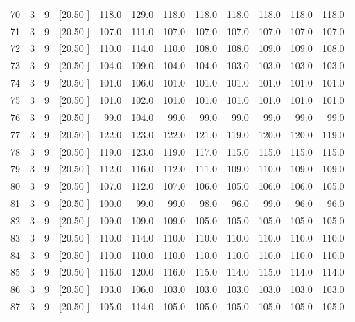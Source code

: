 \documentclass[12pt,a4paper]{article}
\begin{document}
\begin{center}
{\begin{tabular}{r r r r r r r r r r r r}
  70&  3&  9&[20.50     ]&   118.0&   129.0&   118.0&   118.0&   118.0&   118.0&   118.0&   118.0\\[-0.02in]
  71&  3&  9&[20.50     ]&   107.0&   111.0&   107.0&   107.0&   107.0&   107.0&   107.0&   107.0\\[-0.02in]
  72&  3&  9&[20.50     ]&   110.0&   114.0&   110.0&   108.0&   108.0&   109.0&   109.0&   108.0\\[-0.02in]
  73&  3&  9&[20.50     ]&   104.0&   109.0&   104.0&   104.0&   103.0&   103.0&   103.0&   103.0\\[-0.02in]
  74&  3&  9&[20.50     ]&   101.0&   106.0&   101.0&   101.0&   101.0&   101.0&   101.0&   101.0\\[-0.02in]
  75&  3&  9&[20.50     ]&   101.0&   102.0&   101.0&   101.0&   101.0&   101.0&   101.0&   101.0\\[-0.02in]
  76&  3&  9&[20.50     ]&    99.0&   104.0&    99.0&    99.0&    99.0&    99.0&    99.0&    99.0\\[-0.02in]
  77&  3&  9&[20.50     ]&   122.0&   123.0&   122.0&   121.0&   119.0&   120.0&   120.0&   119.0\\[-0.02in]
  78&  3&  9&[20.50     ]&   119.0&   123.0&   119.0&   117.0&   115.0&   115.0&   115.0&   115.0\\[-0.02in]
  79&  3&  9&[20.50     ]&   112.0&   116.0&   112.0&   111.0&   109.0&   110.0&   109.0&   109.0\\[-0.02in]
  80&  3&  9&[20.50     ]&   107.0&   112.0&   107.0&   106.0&   105.0&   106.0&   106.0&   105.0\\[-0.02in]
  81&  3&  9&[20.50     ]&   100.0&    99.0&    99.0&    98.0&    96.0&    99.0&    96.0&    96.0\\[-0.02in]
  82&  3&  9&[20.50     ]&   109.0&   109.0&   109.0&   105.0&   105.0&   105.0&   105.0&   105.0\\[-0.02in]
  83&  3&  9&[20.50     ]&   110.0&   114.0&   110.0&   110.0&   110.0&   110.0&   110.0&   110.0\\[-0.02in]
  84&  3&  9&[20.50     ]&   110.0&   110.0&   110.0&   110.0&   110.0&   110.0&   110.0&   110.0\\[-0.02in]
  85&  3&  9&[20.50     ]&   116.0&   120.0&   116.0&   115.0&   114.0&   115.0&   114.0&   114.0\\[-0.02in]
  86&  3&  9&[20.50     ]&   103.0&   106.0&   103.0&   103.0&   103.0&   103.0&   103.0&   103.0\\[-0.02in]
  87&  3&  9&[20.50     ]&   105.0&   114.0&   105.0&   105.0&   105.0&   105.0&   105.0&   105.0\\[-0.02in]

\end{tabular}}
\end{center}
\end{document}
